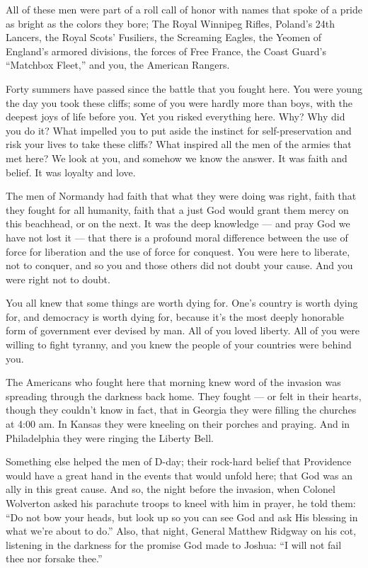 \documentclass[a4paper]{amsbook}
\begin{document}
All of these men were part of a roll call of honor with names that spoke of a pride as bright as the colors they bore; The Royal Winnipeg Rifles, Poland's 24th Lancers, the Royal Scots' Fusiliers, the Screaming Eagles, the Yeomen of England's armored divisions, the forces of Free France, the Coast Guard's “Matchbox Fleet,” and you, the American Rangers.

Forty summers have passed since the battle that you fought here. You were young the day you took these cliffs; some of you were hardly more than boys, with the deepest joys of life before you. Yet you risked everything here. Why? Why did you do it? What impelled you to put aside the instinct for self-preservation and risk your lives to take these cliffs? What inspired all the men of the armies that met here? We look at you, and somehow we know the answer. It was faith and belief. It was loyalty and love.

The men of Normandy had faith that what they were doing was right, faith that they fought for all humanity, faith that a just God would grant them mercy on this beachhead, or on the next. It was the deep knowledge — and pray God we have not lost it — that there is a profound moral difference between the use of force for liberation and the use of force for conquest. You were here to liberate, not to conquer, and so you and those others did not doubt your cause. And you were right not to doubt.

You all knew that some things are worth dying for. One's country is worth dying for, and democracy is worth dying for, because it's the most deeply honorable form of government ever devised by man. All of you loved liberty. All of you were willing to fight tyranny, and you knew the people of your countries were behind you.

The Americans who fought here that morning knew word of the invasion was spreading through the darkness back home. They fought — or felt in their hearts, though they couldn't know in fact, that in Georgia they were filling the churches at 4:00 am. In Kansas they were kneeling on their porches and praying. And in Philadelphia they were ringing the Liberty Bell.

Something else helped the men of D-day; their rock-hard belief that Providence would have a great hand in the events that would unfold here; that God was an ally in this great cause. And so, the night before the invasion, when Colonel Wolverton asked his parachute troops to kneel with him in prayer, he told them: “Do not bow your heads, but look up so you can see God and ask His blessing in what we're about to do.” Also, that night, General Matthew Ridgway on his cot, listening in the darkness for the promise God made to Joshua: “I will not fail thee nor forsake thee.”
\end{document}
